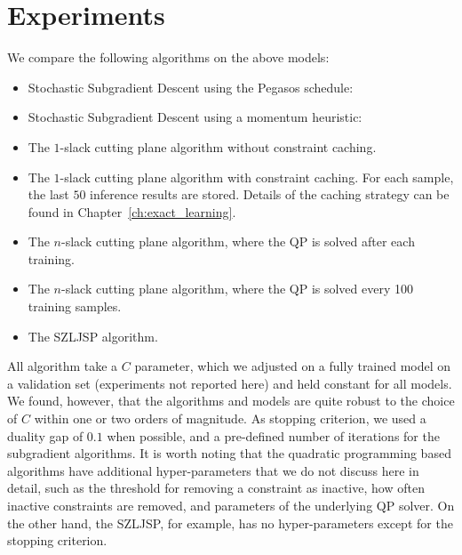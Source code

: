 \section{Experiments}
We compare the following algorithms on the above models:
\begin{itemize}
    \item Stochastic Subgradient Descent using the Pegasos schedule: %
    \item Stochastic Subgradient Descent using a momentum heuristic:
    \item The $1$-slack cutting plane algorithm without constraint caching.
    \item The $1$-slack cutting plane algorithm with constraint caching. For
            each sample, the last $50$ inference results are stored.
            Details of the caching strategy can be found in Chapter~\ref{ch:exact_learning}.
    \item The $n$-slack cutting plane algorithm, where the QP is solved after each training.
    \item The $n$-slack cutting plane algorithm, where the QP is solved every 100 training samples.
    \item The SZLJSP algorithm.
\end{itemize}
All algorithm take a $C$ parameter, which we adjusted on a fully trained model
on a validation set (experiments not reported here) and held constant for all models.
We found, however, that the algorithms and models are quite robust to the choice of $C$ within
one or two orders of magnitude.
As stopping criterion, we used a duality gap of $0.1$ when possible, and a
pre-defined number of iterations for the subgradient algorithms. It is worth
noting that the quadratic programming based algorithms have additional
hyper-parameters that we do not discuss here in detail, such as the threshold
for removing a constraint as inactive, how often inactive constraints are
removed, and parameters of the underlying QP solver. On the other hand, the
SZLJSP, for example, has no hyper-parameters except for the stopping criterion.

